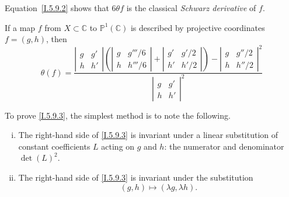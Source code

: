 \documentclass{report}
\theoremstyle{plain}
\theoremstyle{definition}
\newenvironment{env}[1]
    {\renewcommand\theinnercustomenv{#1}\innercustomenv}
    {\endinnercustomenv}
\newcommand{\PP}{\mathbb{P}}
\newcommand{\CC}{\mathbb{C}}
\newcommand{\oldpage}[1]{\marginpar{\footnotesize$\Big\vert$ \textit{p.~#1}}}
\begin{document}
\begin{env}{5.9}
  Equation~\cref{I.5.9.2} shows that $6\theta f$ is the classical \emph{Schwarz derivative} of $f$.

  \bigskip

  If a map $f$ from $X\subset\CC$ to $\PP^1(\CC)$ is described by projective coordinates $f=(g,h)$, then
  \[
  \label{I.5.9.3}
    \theta(f) =
    \frac{
      \left\vert
        \begin{array}{cc}
          g&g'\\h&h'
        \end{array}
      \right\vert
      \left(
        \left\vert
          \begin{array}{cc}
            g&g'''/6\\h&h'''/6
          \end{array}
        \right\vert
        +
        \left\vert
          \begin{array}{cc}
            g'&g'/2\\h'&h'/2
          \end{array}
        \right\vert
      \right)
      -
      \left\vert
        \begin{array}{cc}
          g&g''/2\\h&h''/2
        \end{array}
      \right\vert^2
    }{
      \left\vert
        \begin{array}{cc}
          g&g'\\h&h'
        \end{array}
      \right\vert^2
    }
  \tag{5.9.3}
  \]

  To prove \cref{I.5.9.3}, the simplest method is to note the following.
\oldpage{34}
  \begin{enumerate}[(i)]
    \item The right-hand side of \cref{I.5.9.3} is invariant under a linear substitution of constant coefficients $L$ acting on $g$ and $h$: the numerator and denominator $\det(L)^2$.
    \item The right-hand side of \cref{I.5.9.3} is invariant under the substitution
      \[
        (g,h) \mapsto (\lambda g,\lambda h).
      \]


\end{enumerate}
\end{env}
\end{document}
